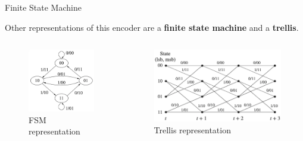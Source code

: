 \documentclass{beamer}
\newcommand{\<}				{\langle}
\renewcommand{\>}      		{\rangle}
\begin{document}
\begin{frame}{Finite State Machine}

Other representations of this encoder are a \textbf{finite state machine} and a \textbf{trellis}. 

\begin{columns}
\begin{column}{0.4\textwidth}

\begin{figure}[h]
\centering
\includegraphics[scale=0.18]{fsm.png}
\caption{FSM representation}
\end{figure}


\end{column}
\begin{column}{0.6\textwidth}

\begin{figure}[h]
\centering
\includegraphics[scale=0.2]{trellis.png}
\caption{Trellis representation}
\end{figure}


\end{column}
\end{columns}
\end{frame}
\end{document}
